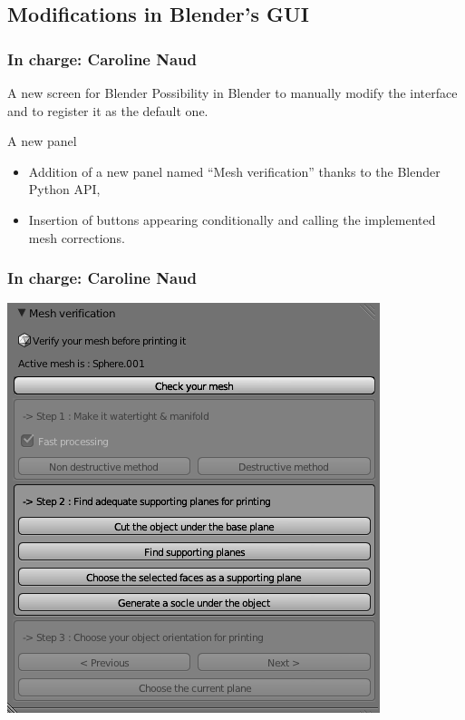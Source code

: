 \documentclass{beamer}
\begin{document}
\subsection{Modifications in Blender's GUI}
\begin{frame}
	\frametitle{In charge: Caroline Naud}

    \begin{block}{A new screen for Blender}
Possibility in Blender to manually modify the interface and to register it as the default one.
    \end{block}
    
    \begin{block}{A new panel}
    \begin{itemize}
	\item Addition of a new panel named “Mesh verification” thanks to the Blender Python API,
	\item Insertion of buttons appearing conditionally and calling the implemented mesh corrections.
	\end{itemize}
    \end{block}
\end{frame}

\begin{frame}
	\frametitle{In charge: Caroline Naud}
    \begin{center}
		\includegraphics[height=.8\textheight]{Panel}
	\end{center}
\end{frame}
\end{document}
